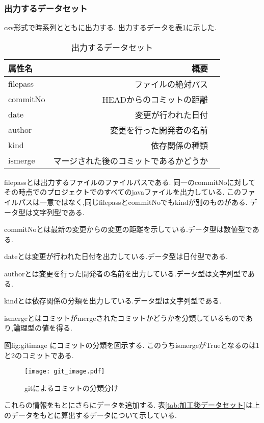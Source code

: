 \documentclass[submit,ses,noauthor]{ipsj} %
\begin{document}
\subsubsection{出力するデータセット}
csv形式で時系列とともに出力する.
出力するデータを表\ref{tab:初期データセット}に示した.


\begin{table}[htb]
\caption{出力するデータセット}
\begin{tabular}{|l|r|r|} \hline
属性名 & 概要 \\ \hline
filepass & ファイルの絶対パス \\ \hline
commitNo & HEADからのコミットの距離 \\ \hline
date & 変更が行われた日付 \\ \hline
author & 変更を行った開発者の名前 \\ \hline
kind & 依存関係の種類 \\ \hline
ismerge & マージされた後のコミットであるかどうか \\ \hline
\end{tabular}
\label{tab:初期データセット}
\end{table}

filepassとは出力するファイルのファイルパスである.
同一のcommitNoに対してその時点でのプロジェクトでのすべてのjavaファイルを出力している.
このファイルパスは一意ではなく,同じfilepassとcommitNoでもkindが別のものがある.
データ型は文字列型である.

commitNoとは最新の変更からの変更の距離を示している.データ型は数値型である.

dateとは変更が行われた日付を出力している.データ型は日付型である.

authorとは変更を行った開発者の名前を出力している.データ型は文字列型である.

kindとは依存関係の分類を出力している.データ型は文字列型である.

ismergeとはコミットがmergeされたコミットかどうかを分類しているものであり,論理型の値を得る.

図{fig:gitimage} にコミットの分類を図示する.
このうちismergeがTrueとなるのは1と2のコミットである.

\begin{figure*}[t]
\centering
\texttt{[image: git\_image.pdf]}
\caption{gitによるコミットの分類分け}
\label{fig:gitimage} 
\end{figure*}


これらの情報をもとにさらにデータを追加する.
表\ref{tab:加工後データセット}は上のデータをもとに算出するデータについて示している.
\end{document}
